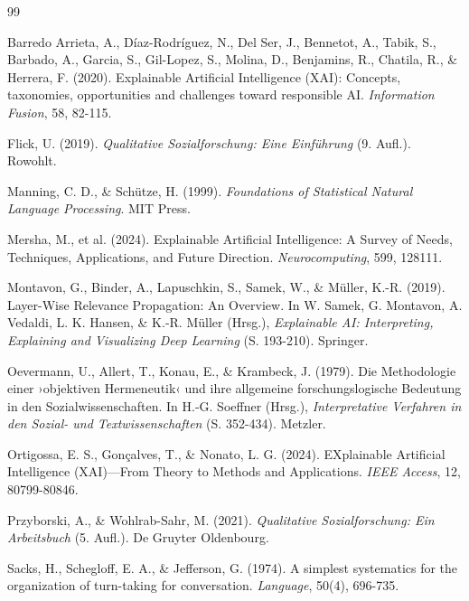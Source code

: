 \documentclass[
  12pt,
  a4paper,
  oneside,
  titlepage
]{article}
\begin{document}
\newpage
\begin{thebibliography}{99}

Barredo Arrieta, A., Díaz-Rodríguez, N., Del Ser, J., Bennetot, A., Tabik, S., 
Barbado, A., Garcia, S., Gil-Lopez, S., Molina, D., Benjamins, R., Chatila, R., 
\& Herrera, F. (2020). Explainable Artificial Intelligence (XAI): Concepts, 
taxonomies, opportunities and challenges toward responsible AI. 
\textit{Information Fusion}, 58, 82-115.

Flick, U. (2019). \textit{Qualitative Sozialforschung: Eine Einführung} (9. Aufl.). 
Rowohlt.

Manning, C. D., \& Schütze, H. (1999). \textit{Foundations of Statistical Natural 
Language Processing}. MIT Press.

Mersha, M., et al. (2024). Explainable Artificial Intelligence: A Survey of Needs, 
Techniques, Applications, and Future Direction. \textit{Neurocomputing}, 599, 128111.

Montavon, G., Binder, A., Lapuschkin, S., Samek, W., \& Müller, K.-R. (2019). 
Layer-Wise Relevance Propagation: An Overview. In W. Samek, G. Montavon, 
A. Vedaldi, L. K. Hansen, \& K.-R. Müller (Hrsg.), \textit{Explainable AI: 
Interpreting, Explaining and Visualizing Deep Learning} (S. 193-210). Springer.

Oevermann, U., Allert, T., Konau, E., \& Krambeck, J. (1979). Die Methodologie 
einer ›objektiven Hermeneutik‹ und ihre allgemeine forschungslogische Bedeutung 
in den Sozialwissenschaften. In H.-G. Soeffner (Hrsg.), \textit{Interpretative 
Verfahren in den Sozial- und Textwissenschaften} (S. 352-434). Metzler.

Ortigossa, E. S., Gonçalves, T., \& Nonato, L. G. (2024). EXplainable Artificial 
Intelligence (XAI)—From Theory to Methods and Applications. \textit{IEEE Access}, 
12, 80799-80846.

Przyborski, A., \& Wohlrab-Sahr, M. (2021). \textit{Qualitative Sozialforschung: 
Ein Arbeitsbuch} (5. Aufl.). De Gruyter Oldenbourg.

Sacks, H., Schegloff, E. A., \& Jefferson, G. (1974). A simplest systematics for 
the organization of turn-taking for conversation. \textit{Language}, 50(4), 696-735.


\end{thebibliography}
\end{document}
